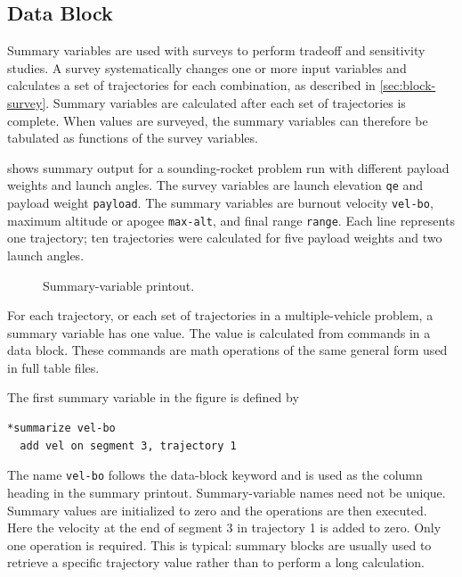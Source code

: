 \subsection{ Data Block}\label{sec:block-summarize}

Summary variables are used with surveys to perform tradeoff and sensitivity studies.
A survey systematically changes one or more input variables and calculates a set of
trajectories for each combination, as described in \cref{sec:block-survey}. Summary
variables are calculated after each set of trajectories is complete. When values are
surveyed, the summary variables can therefore be tabulated as functions of the
survey variables.

 shows summary output for a sounding-rocket
problem run with different payload weights and launch angles. The survey variables
are launch elevation \texttt{qe} and payload weight \texttt{payload}. The summary
variables are burnout velocity \texttt{vel-bo}, maximum altitude or apogee
\texttt{max-alt}, and final range \texttt{range}. Each line represents one trajectory;
ten trajectories were calculated for five payload weights and two launch angles.

\begin{figure}[htbp]
  \centering
  \begin{minipage}{0.78\linewidth}
    
  \end{minipage}
  \caption{Summary-variable printout.}
  \label{fig:summary-variable-printout}
\end{figure}

For each trajectory, or each set of trajectories in a multiple-vehicle problem, a
summary variable has one value. The value is calculated from commands in a
 data block. These commands are math operations of the
same general form used in full table files.

The first summary variable in the figure is defined by

\begin{lstlisting}[style=taosmanual]
*summarize vel-bo
  add vel on segment 3, trajectory 1
\end{lstlisting}

The name \texttt{vel-bo} follows the data-block keyword and is used as the column
heading in the summary printout. Summary-variable names need not be unique.
Summary values are initialized to zero and the operations are then executed. Here the
velocity at the end of segment 3 in trajectory 1 is added to zero. Only one operation
is required. This is typical: summary blocks are usually used to retrieve a specific
trajectory value rather than to perform a long calculation.

